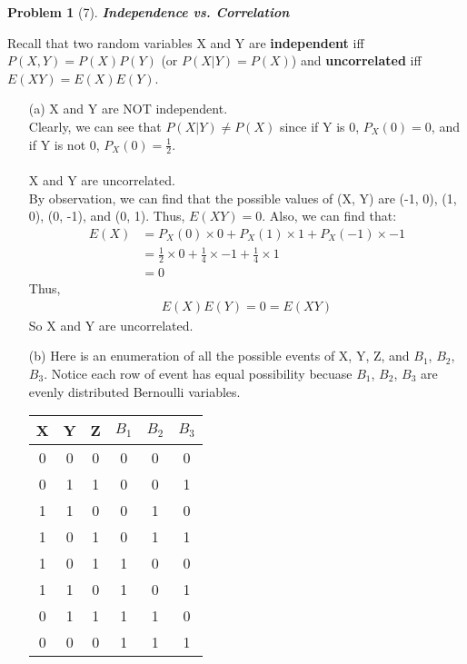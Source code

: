 \documentclass[11pt]{article}
\theoremstyle{quest}
\newtheorem*{question}{Problem}
\begin{document}
\newpage
\begin{question}[7]
\textbf{Independence vs. Correlation}
\end{question}
Recall that two random variables X and Y are \textbf{independent} iff $P(X, Y) = P(X)P(Y)$ (or $P(X|Y) = P(X)$)  and \textbf{uncorrelated} iff $E(XY) = E(X)E(Y)$.
\begin{itemize}
\item[(a)]
X and Y are NOT independent.\\
Clearly, we can see that $P(X|Y) \neq P(X)$ since if Y is 0, $P_{X}(0) = 0$, and if Y is not 0, $P_{X}(0) = \frac{1}{2}$.\\
\\
X and Y are uncorrelated.\\
By observation, we can find that the possible values of (X, Y) are (-1, 0), (1, 0), (0, -1), and (0, 1). Thus, $E(XY) = 0$. Also, we can find that:
\begin{align*}
E(X) &= P_{X}(0) \times 0 + P_{X}(1) \times 1 + P_{X}(-1) \times -1\\
&= \frac{1}{2} \times 0 + \frac{1}{4} \times -1 + \frac{1}{4} \times 1\\
&= 0
\end{align*}
Thus,
\begin{align*}
E(X)E(Y) = 0 = E(XY)
\end{align*}
So X and Y are uncorrelated.
\item[(b)]
Here is an enumeration of all the possible events of X, Y, Z, and $B_1$, $B_2$, $B_3$. Notice each row of event has equal possibility becuase $B_1$, $B_2$, $B_3$ are evenly distributed Bernoulli variables.\\
\begin{center}
\begin{tabular}{|c|c|c|c|c|c|}
\hline
X & Y & Z & $B_1$ & $B_2$ & $B_3$ \\
[0.5ex]
\hline\hline
0 & 0 & 0 & 0 & 0 & 0\\
\hline
0 & 1 & 1 & 0 & 0 & 1\\
\hline
1 & 1 & 0 & 0 & 1 & 0\\
\hline
1 & 0 & 1 & 0 & 1 & 1\\
\hline
1 & 0 & 1 & 1 & 0 & 0\\
\hline
1 & 1 & 0 & 1 & 0 & 1\\
\hline
0 & 1 & 1 & 1 & 1 & 0\\
\hline
0 & 0 & 0 & 1 & 1 & 1\\
\hline
\end{tabular}
\end{center}


\end{itemize}
\end{document}

